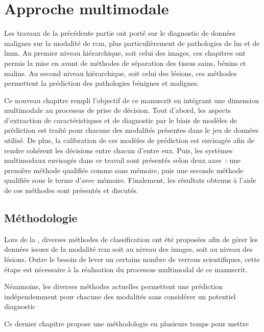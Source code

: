 \renewcommand{\thechapter}{\arabic{chapter}}
\setcounter{chapter}{7}

\chapter{Approche multimodale}
\label{chap:chapter_8}
\chapterintro
Les travaux de la précédente partie ont porté sur le diagnostic de données malignes sur la modalité de \acrlong{rcm}, plus particulièrement de pathologies de \acrlong{lm} et de \acrlong{lmm}. Au premier niveau hiérarchique, soit celui des images, ces chapitres ont permis la mise en avant de méthodes de séparation des tissus sains, bénins et malins. Au second niveau hiérarchique, soit celui des lésions, ces méthodes permettent la prédiction des pathologies bénignes et malignes.\par

Ce nouveau chapitre rempli l'objectif de ce manuscrit en intégrant une dimension multimodale au processus de prise de décision. Tout d'abord, les aspects d'extraction de caractéristiques et de diagnostic par le biais de modèles de prédiction est traité pour chacune des modalités présentes dans le jeu de données utilisé. De plus, la calibration de ces modèles de prédiction est envisagée afin de rendre cohérent les décisions entre chacun d’entre eux. Puis, les systèmes multimodaux envisagés dans ce travail sont présentés selon deux axes~: une première méthode qualifiée comme sans mémoire, puis une seconde méthode qualifiée sous le terme d’avec mémoire. Finalement, les résultats obtenus à l'aide de ces méthodes sont présentés et discutés.\par
\newpage

\section{Méthodologie}
Lors de la , diverses méthodes de classification ont été proposées afin de gérer les données issues de la modalité \gls{rcm} soit au niveau des images, soit au niveau des lésions. Outre le besoin de lever un certains nombre de verrous scientifiques, cette étape est nécessaire à la réalisation du processus multimodal de ce manuscrit.\par

Néanmoins, les diverses méthodes actuelles permettent une prédiction indépendemment pour chacune des modalités sans considérer un potentiel diagnostic 

Ce dernier chapitre propose une méthodologie en plusieurs temps pour mettre

